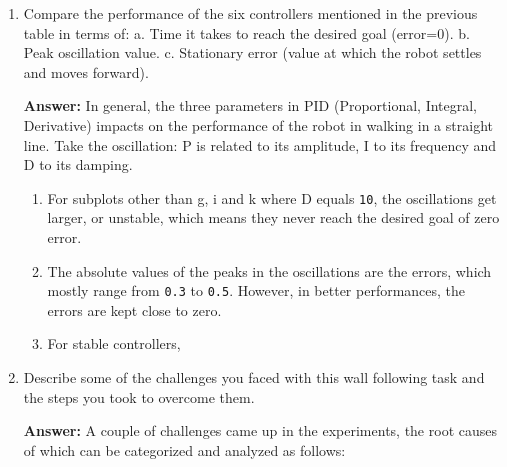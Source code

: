 \documentclass[12pt]{article}
\begin{document}
\begin{enumerate}
    \item Compare the performance of the six controllers mentioned in the previous table in terms of:
    a. Time it takes to reach the desired goal (error=0).
    b. Peak oscillation value.
    c. Stationary error (value at which the robot settles and moves forward).

    \textbf{Answer: }In general, the three parameters in PID (Proportional, Integral, Derivative) impacts on the performance of the robot in walking in a straight line. Take the oscillation:
    P is related to its amplitude, I to its frequency and D to its damping.
    
    \begin{enumerate}
        \item For subplots other than g, i and k where D equals \texttt{10}, the oscillations get larger, or unstable, which means they never reach the desired goal of zero error.
        \item The absolute values of the peaks in the oscillations are the errors, which mostly range from \texttt{0.3} to \texttt{0.5}. However, in better performances, the errors are kept close to zero.
        \item For stable controllers, 
    \end{enumerate}

    \item Describe some of the challenges you faced with this wall following task and the steps you took to overcome them.
    
    \textbf{Answer: }A couple of challenges came up in the experiments, the root causes of which can be categorized and analyzed as follows:


\end{enumerate}
\end{document}
